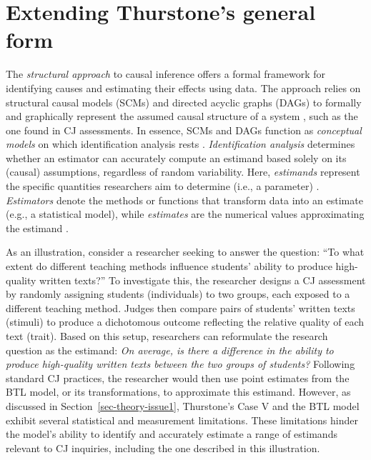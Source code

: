 \documentclass[
  authoryear,
  review,
  1p]{elsarticle}
\begin{document}
\section{Extending Thurstone's general form}\label{sec-theoretical}

The \emph{structural approach} to causal inference
\citep{Pearl_2009, Pearl_et_al_2016} offers a formal framework for
identifying causes and estimating their effects using data. The approach
relies on structural causal models (SCMs) and directed acyclic graphs
(DAGs) to formally and graphically represent the assumed causal
structure of a system
\citep{Morgan_et_al_2014, Gross_et_al_2018, Neal_2020}, such as the one
found in CJ assessments. In essence, SCMs and DAGs function as
\emph{conceptual models} on which identification analysis rests
\citep{Schuessler_et_al_2023}. \emph{Identification analysis} determines
whether an estimator can accurately compute an estimand based solely on
its (causal) assumptions, regardless of random variability. Here,
\emph{estimands} represent the specific quantities researchers aim to
determine (i.e., a parameter) \citep{Everitt_et_al_2010}.
\emph{Estimators} denote the methods or functions that transform data
into an estimate (e.g., a statistical model), while \emph{estimates} are
the numerical values approximating the estimand
\citep{Neal_2020, Everitt_et_al_2010}.

As an illustration, consider a researcher seeking to answer the
question: ``To what extent do different teaching methods influence
students' ability to produce high-quality written texts?'' To
investigate this, the researcher designs a CJ assessment by randomly
assigning students (individuals) to two groups, each exposed to a
different teaching method. Judges then compare pairs of students'
written texts (stimuli) to produce a dichotomous outcome reflecting the
relative quality of each text (trait). Based on this setup, researchers
can reformulate the research question as the estimand: \emph{On average,
is there a difference in the ability to produce high-quality written
texts between the two groups of students?} Following standard CJ
practices, the researcher would then use point estimates from the BTL
model, or its transformations, to approximate this estimand. However, as
discussed in Section~\ref{sec-theory-issue1}, Thurstone's Case V and the
BTL model exhibit several statistical and measurement limitations. These
limitations hinder the model's ability to identify and accurately
estimate a range of estimands relevant to CJ inquiries, including the
one described in this illustration.
\end{document}
